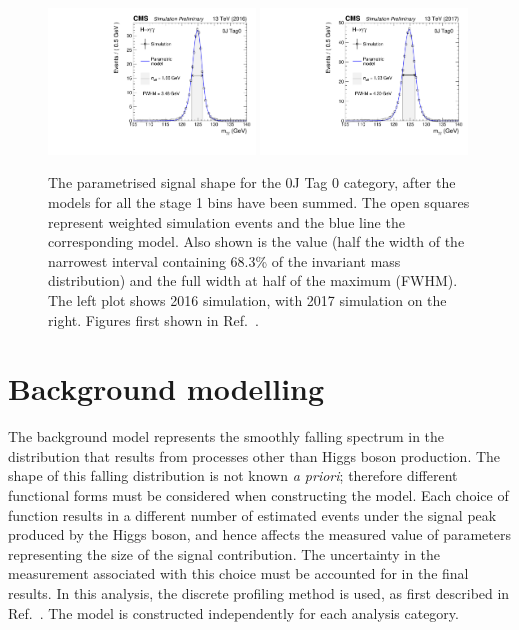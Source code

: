 \begin{figure}[hptb]
  \centering
  \includegraphics[width=0.49\textwidth]{Figures/SigBkg/RECO_0J_Tag0_2016.pdf}
  \includegraphics[width=0.49\textwidth]{Figures/SigBkg/RECO_0J_Tag0_2017.pdf}
  \caption[Signal model for the 0J Tag 0 category.]
  {
    The parametrised signal shape for the 0J Tag 0 category, 
    after the models for all the stage 1 bins have been summed.
    The open squares represent weighted simulation events and the blue line the
    corresponding model. Also shown is the \seff value (half the width of the narrowest interval
    containing 68.3\% of the invariant mass distribution) and the full width at half of the maximum
    (FWHM). The left plot shows 2016 simulation, with 2017 simulation on the right.
    Figures first shown in Ref.~\cite{HIG-18-029}.
  }
  \label{fig:sigbkg_cat}
\end{figure}

\section{Background modelling}

The background model represents the smoothly falling spectrum 
in the \mgg distribution that results from processes other than Higgs boson production.
The shape of this falling distribution is not known \textit{a priori};
therefore different functional forms must be considered when constructing the model.
Each choice of function results in a different number of estimated events 
under the signal peak produced by the Higgs boson, 
and hence affects the measured value of parameters representing the size of the signal contribution.
The uncertainty in the measurement associated with this choice must be accounted for 
in the final results.
In this analysis, the discrete profiling method is used, as first described in Ref.~\cite{Envelope}.
The model is constructed independently for each analysis category.

